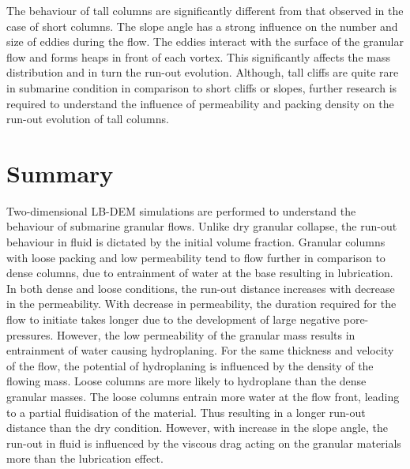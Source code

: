 The behaviour of tall columns are significantly different from that observed in 
the case of short columns. The slope angle has a strong influence on the number 
and size of eddies during the flow. The eddies interact with the surface of the 
granular flow and forms heaps in front of each vortex. This significantly 
affects the mass distribution and in turn the run-out evolution. Although, tall 
cliffs are quite rare in submarine condition in comparison to short cliffs or 
slopes, further research is required to understand the influence of 
permeability and packing density on the run-out evolution of tall columns. 

\section{Summary}

Two-dimensional LB-DEM simulations are performed to understand the behaviour 
of submarine granular flows. Unlike dry granular collapse, the run-out 
behaviour in fluid is dictated by the initial volume fraction. Granular columns 
with loose packing and low permeability tend to flow further in comparison to 
dense columns, due to entrainment of water at the base resulting in 
lubrication. In both dense and loose conditions, the run-out distance increases 
with decrease in the permeability. With decrease in permeability, the duration 
required for the flow to initiate takes longer due to the development of large 
negative pore-pressures. However, the low permeability of the granular mass 
results in entrainment of water causing hydroplaning. For the same 
thickness and velocity of the flow, the potential of hydroplaning is influenced 
by the density of the flowing mass. Loose columns are more likely to hydroplane 
than the dense granular masses. The loose columns entrain more water 
at the flow front, leading to a partial fluidisation of the material. Thus 
resulting in a longer run-out distance than the dry condition. However, 
with increase in the slope angle, the run-out in fluid is influenced by the 
viscous drag acting on the granular materials more than the lubrication effect. 
